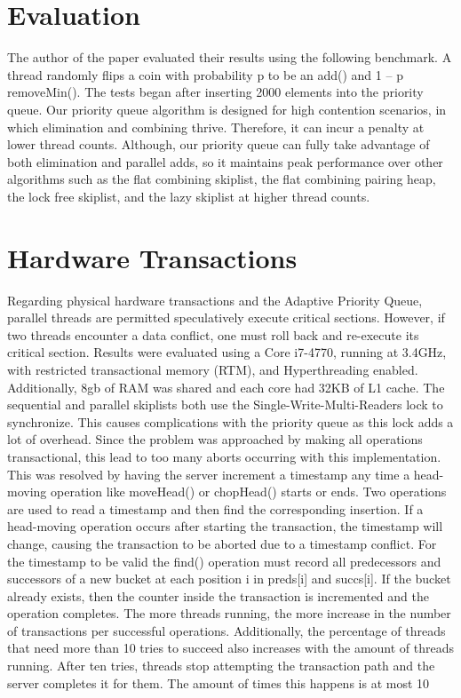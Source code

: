\documentclass[10pt]{asme2ej}
\begin{document}
\section{Evaluation}

The author of the paper evaluated their results using the following benchmark. A thread randomly flips a coin with probability p to be an add() and 1 – p removeMin(). The tests began after inserting 2000 elements into the priority queue. Our priority queue algorithm is designed for high contention scenarios, in which elimination and combining thrive. Therefore, it can incur a penalty at lower thread counts. Although, our priority queue can fully take advantage of both elimination and parallel adds, so it maintains peak performance over other algorithms such as the flat combining skiplist, the flat combining pairing heap, the lock free skiplist, and the lazy skiplist at higher thread counts.

\section{Hardware Transactions}

Regarding physical hardware transactions and the Adaptive Priority Queue, parallel threads are permitted speculatively execute critical sections. However, if two threads encounter a data conflict, one must roll back and re-execute its critical section. Results were evaluated using a Core i7-4770, running at 3.4GHz, with restricted transactional memory (RTM), and Hyperthreading enabled. Additionally, 8gb of RAM was shared and each core had 32KB of L1 cache\cite{latex}. 
\linebreak
\linebreak
\indent The sequential and parallel skiplists both use the Single-Write-Multi-Readers lock to synchronize. This causes complications with the priority queue as this lock adds a lot of overhead. Since the problem was approached by making all operations transactional, this lead to too many aborts occurring with this implementation. This was resolved by having the server increment a timestamp any time a head-moving operation like moveHead() or chopHead() starts or ends. Two operations are used to read a timestamp and then find the corresponding insertion. If a head-moving operation occurs after starting the transaction, the timestamp will change, causing the transaction to be aborted due to a timestamp conflict. For the timestamp to be valid the find() operation must record all predecessors and successors of a new bucket at each position i in preds[i] and succs[i]. If the bucket already exists, then the counter inside the transaction is incremented and the operation completes. The more threads running, the more increase in the number of transactions per successful operations. Additionally, the percentage of threads that need more than 10 tries to succeed also increases with the amount of threads running. After ten tries, threads stop attempting the transaction path and the server completes it for them. The amount of times this happens is at most 10%
\end{document}
